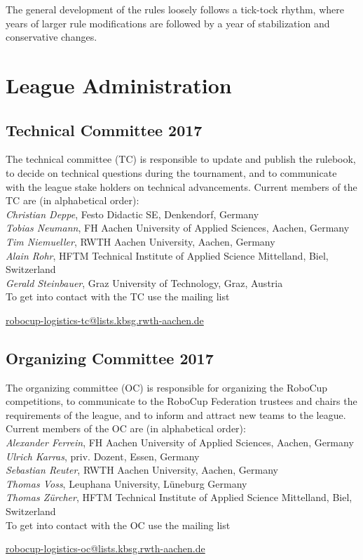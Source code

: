 \documentclass[12pt,twoside]{article}
\begin{document}
The general development of the rules loosely follows a tick-tock
rhythm, where years of larger rule modifications are followed by a
year of stabilization and conservative changes.


\section{League Administration} \label{sec:commitees}
\subsection{Technical Committee 2017}
\label{sec:tc}
The technical committee (TC) is responsible to update and publish the
rulebook, to decide on technical questions during the tournament, and
to communicate with the league stake holders on technical
advancements. Current members of the TC are (in alphabetical order):\\[.5em]
\emph{Christian Deppe}, Festo Didactic SE, Denkendorf, Germany\\
\emph{Tobias Neumann}, FH Aachen University of Applied Sciences,
Aachen, Germany\\
\emph{Tim Niemueller}, RWTH Aachen University, Aachen, Germany\\
\emph{Alain Rohr}, HFTM Technical Institute of Applied Science Mittelland, Biel, Switzerland\\
\emph{Gerald Steinbauer}, Graz University of Technology, Graz, Austria\\[.5em]
To get into contact with the TC use the mailing list\\
\centerline{\url{robocup-logistics-tc@lists.kbsg.rwth-aachen.de}}

\subsection{Organizing Committee 2017}
\label{sec:oc}
The organizing committee (OC) is responsible for organizing the
RoboCup competitions, to communicate to the RoboCup Federation
trustees and chairs the requirements of the league, and to inform and
attract new teams to the league. Current members of the OC are (in
alphabetical order):\\[.5em]
\emph{Alexander Ferrein}, FH Aachen University of Applied Sciences, Aachen, Germany\\
\emph{Ulrich Karras}, priv. Dozent, Essen, Germany\\
\emph{Sebastian Reuter}, RWTH Aachen University, Aachen, Germany\\
\emph{Thomas Voss}, Leuphana University, Lüneburg Germany\\
\emph{Thomas Zürcher}, HFTM Technical Institute of Applied Science Mittelland, Biel, Switzerland\\[.5em]
To get into contact with the OC use the mailing list\\
\centerline{\url{robocup-logistics-oc@lists.kbsg.rwth-aachen.de}}
\end{document}

